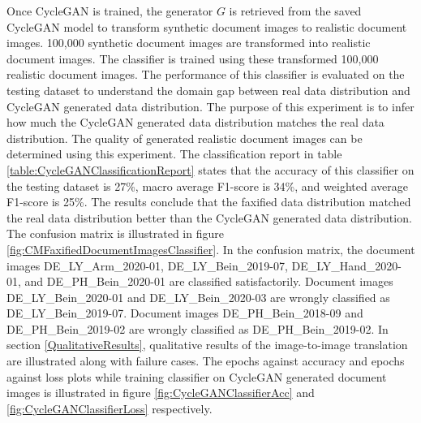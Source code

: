 Once \ac{CycleGAN} is trained, the generator $G$ is retrieved from the saved \ac{CycleGAN} model to transform synthetic document images to realistic document images. 100,000 synthetic document images are transformed into realistic document images. The classifier is trained using these transformed 100,000 realistic document images. The performance of this classifier is evaluated on the testing dataset to understand the domain gap between real data distribution and \ac{CycleGAN} generated data distribution. The purpose of this experiment is to infer how much the \ac{CycleGAN} generated data distribution matches the real data distribution. The quality of generated realistic document images can be determined using this experiment. The classification report in table \ref{table:CycleGANClassificationReport} states that the accuracy of this classifier on the testing dataset is 27\%, macro average F1-score is 34\%, and weighted average F1-score is 25\%. The results conclude that the faxified data distribution matched the real data distribution better than the \ac{CycleGAN} generated data distribution. The confusion matrix is illustrated in figure \ref{fig:CMFaxifiedDocumentImagesClassifier}. In the confusion matrix, the document images DE\_LY\_Arm\_2020-01, DE\_LY\_Bein\_2019-07,  DE\_LY\_Hand\_2020-01, and DE\_PH\_Bein\_2020-01 are classified satisfactorily. Document images DE\_LY\_Bein\_2020-01 and DE\_LY\_Bein\_2020-03 are wrongly classified as DE\_LY\_Bein\_2019-07. Document images DE\_PH\_Bein\_2018-09 and DE\_PH\_Bein\_2019-02 are wrongly classified as DE\_PH\_Bein\_2019-02. In section \ref{QualitativeResults}, qualitative results of the image-to-image translation are illustrated along with failure cases. The epochs against accuracy and epochs against loss plots while training classifier on \ac{CycleGAN} generated document images is illustrated in figure \ref{fig:CycleGANClassifierAcc} and \ref{fig:CycleGANClassifierLoss} respectively.


